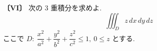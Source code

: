\noindent\textbf{〔VI〕}
次の 3 重積分を求めよ.
\[
\iiint_D z\,dx\,dy\,dz
\]
ここで $D:\ \dfrac{x^2}{a^2}+\dfrac{y^2}{b^2}+\dfrac{z^2}{c^2}\le 1,\ 0\le z$ とする.

